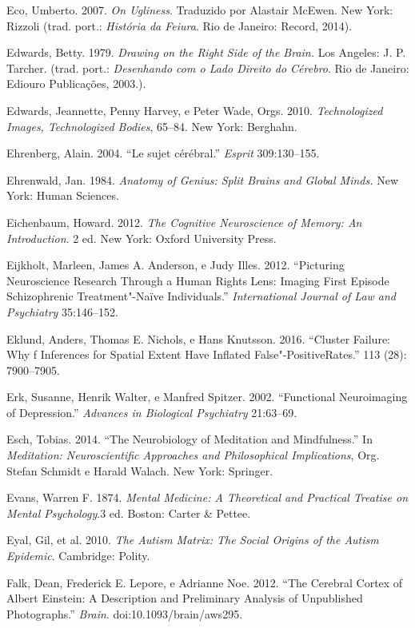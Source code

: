 {\begin{Parskip}
Eco, Umberto. 2007. \emph{On Ugliness}. Traduzido por Alastair McEwen.
New York: Rizzoli (trad. port.: \emph{História da Feiura}. Rio de
Janeiro: Record, 2014).

Edwards, Betty. 1979. \emph{Drawing on the Right Side of the Brain.} Los
Angeles: J. P. Tarcher. (trad. port.: \emph{Desenhando com o Lado
Direito do Cérebro}. Rio de Janeiro: Ediouro Publicações, 2003.).

Edwards, Jeannette, Penny Harvey, e Peter Wade, Orgs. 2010.
\emph{Technologized Images, Technologized Bodies}, 65--84. New York:
Berghahn.

Ehrenberg, Alain. 2004. ``Le sujet cérébral.'' \emph{Esprit}
309:130--155.

Ehrenwald, Jan. 1984. \emph{Anatomy of Genius: Split Brains and Global
Minds.} New York: Human Sciences.

Eichenbaum, Howard. 2012. \emph{The Cognitive Neuroscience of Memory: An
Introduction}. 2 ed. New York: Oxford University Press.

Eijkholt, Marleen, James A. Anderson, e Judy Illes. 2012. ``Picturing
Neuroscience Research Through a Human Rights Lens: Imaging First Episode
Schizophrenic Treatment"-Naïve Individuals.'' \emph{International Journal
of Law and Psychiatry} 35:146--152.

Eklund, Anders, Thomas E. Nichols, e Hans Knutsson. 2016. ``Cluster
Failure: Why f Inferences for Spatial Extent Have Inflated
False"-PositiveRates.'' \emph{} 113 (28): 7900--7905.

Erk, Susanne, Henrik Walter, e Manfred Spitzer. 2002. ``Functional
Neuroimaging of Depression.'' \emph{Advances in Biological Psychiatry}
21:63--69.

Esch, Tobias. 2014. ``The Neurobiology of Meditation and Mindfulness.''
In \emph{Meditation: Neuroscientific Approaches and Philosophical
Implications}, Org. Stefan Schmidt e Harald Walach. New York: Springer.

Evans, Warren F. 1874. \emph{Mental Medicine: A Theoretical and
Practical Treatise on Mental Psychology}.3 ed. Boston: Carter \& Pettee.

Eyal, Gil, et al. 2010. \emph{The Autism Matrix: The Social Origins of
the Autism Epidemic}. Cambridge: Polity.

Falk, Dean, Frederick E. Lepore, e Adrianne Noe. 2012. ``The Cerebral
Cortex of Albert Einstein: A Description and Preliminary Analysis of
Unpublished Photographs.'' \emph{Brain}. doi:10.1093/brain/aws295.


\end{Parskip}}
